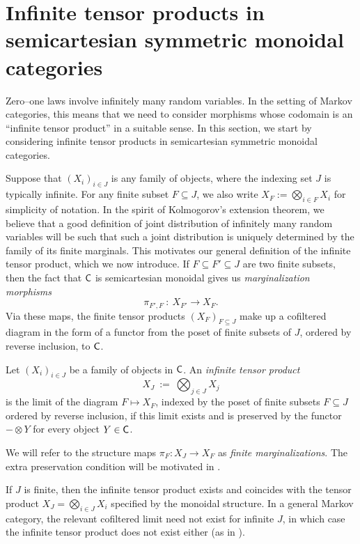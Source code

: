 \documentclass[11pt]{article}
\begin{document}
\section{Infinite tensor products in semicartesian symmetric monoidal categories}
\label{infprod_semicartesian}

Zero--one laws involve infinitely many random variables. In the setting of Markov categories, this means that we need to consider morphisms whose codomain is an ``infinite tensor product'' in a suitable sense. In this section, we start by considering infinite tensor products in semicartesian symmetric monoidal categories.

Suppose that $(X_i)_{i \in J}$ is any family of objects, where the indexing set $J$ is typically infinite. For any finite subset $F \subseteq J$, we also write $X_F := \bigotimes_{i \in F} X_i$ for simplicity of notation. In the spirit of Kolmogorov's extension theorem, we believe that a good definition of joint distribution of infinitely many random variables will be such that such a joint distribution is uniquely determined by the family of its finite marginals. This motivates our general definition of the infinite tensor product, which we now introduce. If $F \subseteq F' \subseteq J$ are two finite subsets, then the fact that $\mathsf{C}$ is semicartesian monoidal gives us \emph{marginalization morphisms}
\[
	\pi_{F',F} \: : \: X_{F'} \longrightarrow X_F.
\]
Via these maps, the finite tensor products $(X_F)_{F \subseteq J}$ make up a cofiltered diagram in the form of a functor from the poset of finite subsets of $J$, ordered by reverse inclusion, to $\mathsf{C}$.

\begin{definition}
	\label{semicartesian_infproduct}
	Let $(X_i)_{i \in J}$ be a family of objects in $\mathsf{C}$. An \emph{infinite tensor product}
	\[
		X_J \: := \: \bigotimes_{j \in J} X_j
	\]
	is the limit of the diagram $F \mapsto X_F$, indexed by the poset of finite subsets $F \subseteq J$ ordered by reverse inclusion, if this limit exists and is preserved by the functor $- \otimes Y$ for every object $Y \in \mathsf{C}$.
\end{definition}

We will refer to the structure maps $\pi_F : X_J \to X_F$ as \emph{finite marginalizations}. The extra preservation condition will be motivated in .

\begin{remark}
	If $J$ is finite, then the infinite tensor product exists and coincides with the tensor product $X_J = \bigotimes_{i \in J} X_i$ specified by the monoidal structure. In a general Markov category, the relevant cofiltered limit need not exist for infinite $J$, in which case the infinite tensor product does not exist either (as in ).
\end{remark}
\end{document}
